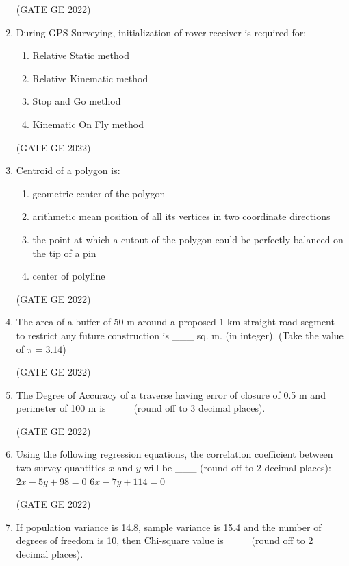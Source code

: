 \documentclass[journal,12pt,onecolumn]{IEEEtran}
\theoremstyle{remark}
\begin{document}
\begin{enumerate}
\hfill (GATE GE 2022)

\item During GPS Surveying, initialization of rover receiver is required for:
\begin{enumerate}
    \item Relative Static method
    \item Relative Kinematic method
    \item Stop and Go method
    \item Kinematic On Fly method
\end{enumerate}

\hfill (GATE GE 2022)

\item Centroid of a polygon is:
\begin{enumerate}
    \item geometric center of the polygon
    \item arithmetic mean position of all its vertices in two coordinate directions
    \item the point at which a cutout of the polygon could be perfectly balanced on the tip of a pin
    \item center of polyline
\end{enumerate}

\hfill (GATE GE 2022)

\item The area of a buffer of 50 m around a proposed 1 km straight road segment to restrict any future construction is \_\_\_ sq. m. (in integer). (Take the value of $\pi = 3.14$)

\hfill (GATE GE 2022)

\item The Degree of Accuracy of a traverse having error of closure of 0.5 m and perimeter of 100 m is \_\_\_ (round off to 3 decimal places).

\hfill (GATE GE 2022)

\item Using the following regression equations, the correlation coefficient between two survey quantities $x$ and $y$ will be \_\_\_ (round off to 2 decimal places):  
$2x - 5y + 98 = 0$  
$6x - 7y + 114 = 0$

\hfill (GATE GE 2022)

\item If population variance is 14.8, sample variance is 15.4 and the number of degrees of freedom is 10, then Chi-square value is \_\_\_ (round off to 2 decimal places).


\end{enumerate}
\end{document}
